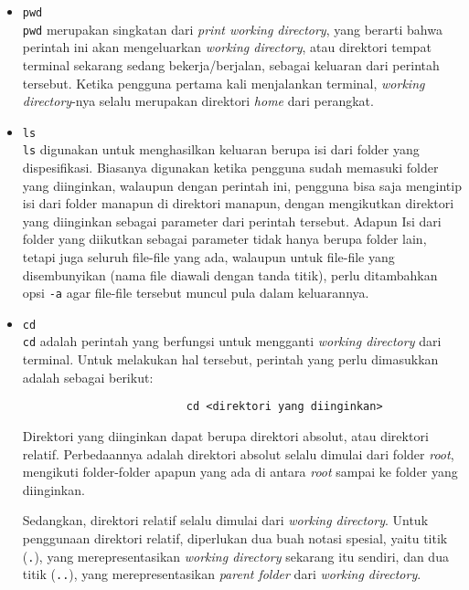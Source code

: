 \begin{itemize}
	\item \verb|pwd| \cite{shottsjr:2019:linuxcommandline}\\
	\verb|pwd| merupakan singkatan dari \textit{print working directory}, yang berarti bahwa perintah ini akan mengeluarkan \textit{working directory}, atau direktori tempat terminal sekarang sedang bekerja/berjalan, sebagai keluaran dari perintah tersebut. Ketika pengguna pertama kali menjalankan terminal, \textit{working directory}-nya selalu merupakan direktori \textit{home} dari perangkat.
	\item \verb|ls| \cite{shottsjr:2019:linuxcommandline}\\
	\verb|ls| digunakan untuk menghasilkan keluaran berupa isi dari folder yang dispesifikasi. Biasanya digunakan ketika pengguna sudah memasuki folder yang diinginkan, walaupun dengan perintah ini, pengguna bisa saja mengintip isi dari folder manapun di direktori manapun, dengan mengikutkan direktori yang diinginkan sebagai parameter dari perintah tersebut. Adapun Isi dari folder yang diikutkan sebagai parameter tidak hanya berupa folder lain, tetapi juga seluruh file-file yang ada, walaupun untuk file-file yang disembunyikan (nama file diawali dengan tanda titik), perlu ditambahkan opsi \verb|-a| agar file-file tersebut muncul pula dalam keluarannya.
	\item \verb|cd| \cite{shottsjr:2019:linuxcommandline}\\
	\verb|cd| adalah perintah yang berfungsi untuk mengganti \textit{working directory} dari terminal. Untuk melakukan hal tersebut, perintah yang perlu dimasukkan adalah sebagai berikut:
	
	\begin{verbatim}
	                     cd <direktori yang diinginkan>
	\end{verbatim}
	
	Direktori yang diinginkan dapat berupa direktori absolut, atau direktori relatif. Perbedaannya adalah direktori absolut selalu dimulai dari folder \textit{root}, mengikuti folder-folder apapun yang ada di antara \textit{root} sampai ke folder yang diinginkan.
	
	Sedangkan, direktori relatif selalu dimulai dari \textit{working directory}. Untuk penggunaan direktori relatif, diperlukan dua buah notasi spesial, yaitu titik (\verb|.|), yang merepresentasikan \textit{working directory} sekarang itu sendiri, dan dua titik (\verb|..|), yang merepresentasikan \textit{parent folder} dari \textit{working directory}.
\end{itemize}

